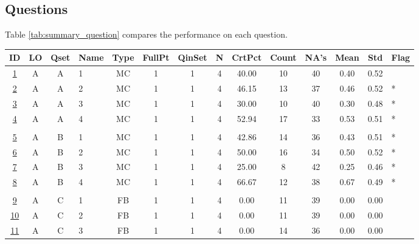 \documentclass[12pt,english,nohyper]{tufte-handout}\usepackage[]{graphicx}\usepackage[]{color}
\begin{document}
\clearpage
\newpage{}
\subsection{Questions}

Table \ref{tab:summary_question} compares the performance on each question.



\begin{longtable}{cccl|cccc|ccccc|l}
  \hline
ID & LO & Qset & Name & Type & FullPt & QinSet & N & CrtPct & Count & NA's & Mean & Std & Flag \\ 
  \hline
\hyperlink{T06.A.A.04.1.1.MC.1.2}{1} & A & A & 1 & MC &   1 &   1 &   4 & 40.00 &  10 &  40 & 0.40 & 0.52 &  \\ 
  \hyperlink{T06.A.A.04.1.1.MC.2.2}{2} & A & A & 2 & MC &   1 &   1 &   4 & 46.15 &  13 &  37 & 0.46 & 0.52 & * \\ 
  \hyperlink{T06.A.A.04.1.1.MC.3.2}{3} & A & A & 3 & MC &   1 &   1 &   4 & 30.00 &  10 &  40 & 0.30 & 0.48 & * \\ 
  \hyperlink{T06.A.A.04.1.1.MC.4.2}{4} & A & A & 4 & MC &   1 &   1 &   4 & 52.94 &  17 &  33 & 0.53 & 0.51 & * \\ 
   &  &  &  &  &  &  &  &  &  &  &  &  &  \\ 
  \hyperlink{T06.A.B.04.1.1.MC.1.2}{5} & A & B & 1 & MC &   1 &   1 &   4 & 42.86 &  14 &  36 & 0.43 & 0.51 & * \\ 
  \hyperlink{T06.A.B.04.1.1.MC.2.2}{6} & A & B & 2 & MC &   1 &   1 &   4 & 50.00 &  16 &  34 & 0.50 & 0.52 & * \\ 
  \hyperlink{T06.A.B.04.1.1.MC.3.2}{7} & A & B & 3 & MC &   1 &   1 &   4 & 25.00 &   8 &  42 & 0.25 & 0.46 & * \\ 
  \hyperlink{T06.A.B.04.1.1.MC.4.2}{8} & A & B & 4 & MC &   1 &   1 &   4 & 66.67 &  12 &  38 & 0.67 & 0.49 & * \\ 
   &  &  &  &  &  &  &  &  &  &  &  &  &  \\ 
  \hyperlink{T06.A.C.04.1.1.FB.1.2}{9} & A & C & 1 & FB &   1 &   1 &   4 & 0.00 &  11 &  39 & 0.00 & 0.00 &  \\ 
  \hyperlink{T06.A.C.04.1.1.FB.2.2}{10} & A & C & 2 & FB &   1 &   1 &   4 & 0.00 &  11 &  39 & 0.00 & 0.00 &  \\ 
  \hyperlink{T06.A.C.04.1.1.FB.3.2}{11} & A & C & 3 & FB &   1 &   1 &   4 & 0.00 &  14 &  36 & 0.00 & 0.00 &  \\ 

\end{longtable}
\end{document}
